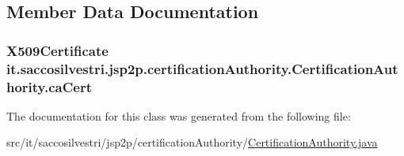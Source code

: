 \subsection{\-Member \-Data \-Documentation}
\hypertarget{classit_1_1saccosilvestri_1_1jsp2p_1_1certification_authority_1_1_certification_authority_a778a02a715b6e7fdbcb65edb08c211e8}{
\subsubsection[{ca\-Cert}]{\setlength{\rightskip}{0pt plus 5cm}\-X509\-Certificate {\bf it.\-saccosilvestri.\-jsp2p.\-certification\-Authority.\-Certification\-Authority.\-ca\-Cert}}}
\label{classit_1_1saccosilvestri_1_1jsp2p_1_1certification_authority_1_1_certification_authority_a778a02a715b6e7fdbcb65edb08c211e8}


\-The documentation for this class was generated from the following file\-:\begin{DoxyCompactItemize}
\item 
src/it/saccosilvestri/jsp2p/certification\-Authority/\hyperlink{_certification_authority_8java}{\-Certification\-Authority.\-java}\end{DoxyCompactItemize}
